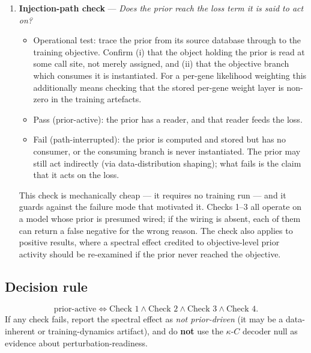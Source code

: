 \documentclass[11 pt,a4 paper]{article}
\begin{document}
\begin{enumerate}[leftmargin=1.4 em,label=\textbf{Check \arabic*.}]
\item \textbf{Injection-path check} ---
 \emph{Does the prior reach the loss term it is said to act on?}
 \begin{itemize}[leftmargin=1.2 em]
 \item Operational test: trace the prior from its source database through
 to the training objective. Confirm (i) that the object holding the
 prior is read at some call site, not merely assigned, and (ii) that
 the objective branch which consumes it is instantiated. For a
 per-gene likelihood weighting this additionally means checking that
 the stored per-gene weight layer is non-zero in the training
 artefacts.
 \item Pass (prior-active): the prior has a reader, and that reader feeds
 the loss.
 \item Fail (path-interrupted): the prior is computed and stored but has no
 consumer, or the consuming branch is never instantiated. The prior
 may still act indirectly (via data-distribution shaping); what fails
 is the claim that it acts on the loss.
 \end{itemize}

 This check is mechanically cheap --- it requires no training run --- and it
 guards against the failure mode that motivated it. Checks 1--3 all operate
 on a model whose prior is presumed wired; if the wiring is absent, each of
 them can return a false negative for the wrong reason. The check also
 applies to positive results, where a spectral effect credited to objective-level
 prior activity should be re-examined if the prior never reached the
 objective.
\end{enumerate}

\subsection*{Decision rule}
\[
\text{prior-active} \iff \text{Check 1} \land \text{Check 2} \land \text{Check 3} \land \text{Check 4}.
\]
If any check fails, report the spectral effect as \emph{not prior-driven} (it may
be a data-inherent or training-dynamics artifact), and do \textbf{not} use the
$\kappa$-$C$ decoder null as evidence about perturbation-readiness.
\end{document}

